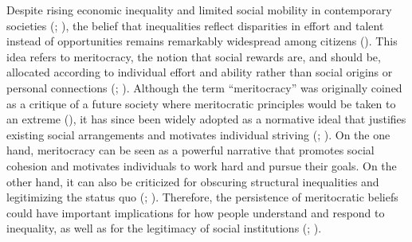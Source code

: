 \documentclass[
  13pt,
]{article}
\begin{document}
Despite rising economic inequality and limited social mobility in
contemporary societies (; ), the belief that inequalities reflect disparities in
effort and talent instead of opportunities remains remarkably widespread
among citizens (). This idea
refers to meritocracy, the notion that social rewards are, and should
be, allocated according to individual effort and ability rather than
social origins or personal connections
(;
). Although the term
``meritocracy'' was originally coined as a critique of a future society
where meritocratic principles would be taken to an extreme
(), it has since been widely
adopted as a normative ideal that justifies existing social arrangements
and motivates individual striving
(;
). On the one hand,
meritocracy can be seen as a powerful narrative that promotes social
cohesion and motivates individuals to work hard and pursue their goals.
On the other hand, it can also be criticized for obscuring structural
inequalities and legitimizing the status quo
(;
). Therefore, the persistence of meritocratic beliefs could have
important implications for how people understand and respond to
inequality, as well as for the legitimacy of social institutions
(;
).
\end{document}
